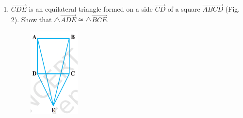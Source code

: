 \begin{enumerate}[label=\arabic*.,ref=\thesubsection.\theenumi]
\begin{figure}[h]
	\caption{}
	\label{fig:exemplar/9.7.37.3.2}
\end{figure}
\item $\vec{CDE}$ is an equilateral triangle formed on a side $\vec{CD}$ of a square $\vec{ABCD}$ (Fig. \ref{fig:exemplar/9.7.37.3.3}). Show that $\triangle \vec{ADE} \cong \triangle \vec{BCE}$.
\begin{figure}[h]
	\centering
	\includegraphics[width=\columnwidth]{chapters/exemplar/9.7.3/figs/Figure2.png}
	\caption{}
	\label{fig:exemplar/9.7.37.3.3}

\end{figure}
\end{enumerate}
